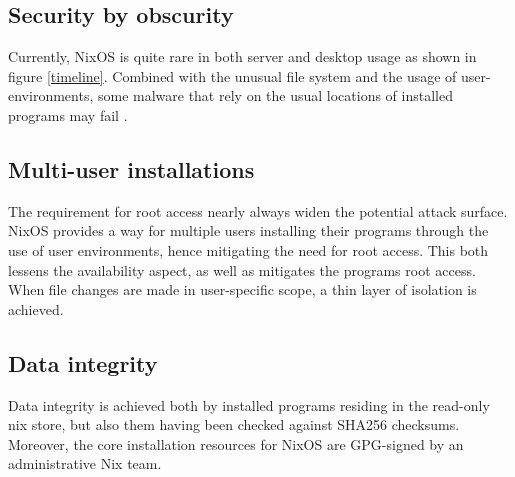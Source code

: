 \subsection{Security by obscurity}

Currently, NixOS is quite rare in both server and desktop usage as shown in figure \ref{timeline}. Combined with the unusual file system and the usage of user-environments, some malware that rely on the usual locations of installed programs may fail \cite{nixosSecurityNixOS}.

\subsection{Multi-user installations}
The requirement for root access nearly always widen the potential attack surface. NixOS provides a way for multiple users installing their programs through the use of user environments, hence mitigating the need for root access. This both lessens the availability aspect, as well as mitigates the programs root access. When file changes are made in user-specific scope, a thin layer of isolation is achieved. \cite{nixosNixOSManual}

\subsection{Data integrity}
Data integrity is achieved both by installed programs residing in the read-only nix store, but also them having been checked against SHA256 checksums. Moreover, the core installation resources for NixOS are GPG-signed by an administrative Nix team. \cite{nixosSecurityNixOS}